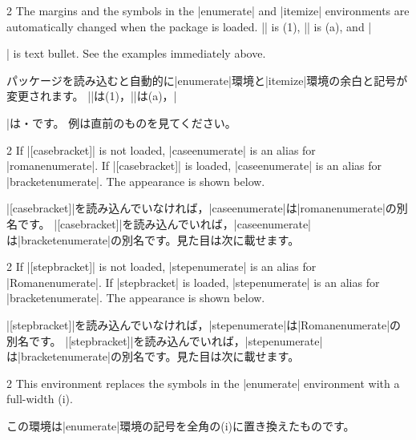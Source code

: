 \documentclass[%
fleqn,%
paper=a4paper,%
fontsize=10pt,%
open_bracket_pos=zenkakunibu_nibu,%
hanging_punctuation,%
]%
{jlreq}
\newenvironment{translateing}%
{\begin{multicolpar}{2}}
{\end{multicolpar}\vspace{\baselineskip}}
\DeclareRobustCommand{\commandtojskip}{\hspace{2.40554pt plus 1.49994pt minus 0.59998pt}}
\begin{document}
\newpage
{}

\begin{translateing}
The margins and the symbols in the |enumerate| and |itemize| environments are automatically changed when the package is loaded.
|| is (1), || is (a), and |\item| is text bullet.
See the examples immediately above.

パッケージを読み込むと自動的に|enumerate|環境と|itemize|環境の余白と記号が変更されます。
||\commandtojskip は(1)，||\commandtojskip は(a)，|\item|\commandtojskip は・です。
例は直前のものを見てください。
\end{translateing}


\begin{translateing}
If |[casebracket]| is not loaded, |caseenumerate| is an alias for |romanenumerate|.
If |[casebracket]| is loaded, |caseenumerate| is an alias for |bracketenumerate|.
The appearance is shown below.

|[casebracket]|を読み込んでいなければ，|caseenumerate|は|romanenumerate|の別名です。
|[casebracket]|を読み込んでいれば，|caseenumerate|は|bracketenumerate|の別名です。見た目は次に載せます。
\end{translateing}


\begin{translateing}
If |[stepbracket]| is not loaded, |stepenumerate| is an alias for |Romanenumerate|.
If |stepbracket| is loaded, |stepenumerate| is an alias for |bracketenumerate|.
The appearance is shown below.

|[stepbracket]|を読み込んでいなければ，|stepenumerate|は|Romanenumerate|の別名です。
|[stepbracket]|を読み込んでいれば，|stepenumerate|は|bracketenumerate|の別名です。見た目は次に載せます。
\end{translateing}


\begin{translateing}
This environment replaces the symbols in the |enumerate| environment with a full-width (i).

この環境は|enumerate|環境の記号を全角の(i)に置き換えたものです。
\end{translateing}
\end{document}
